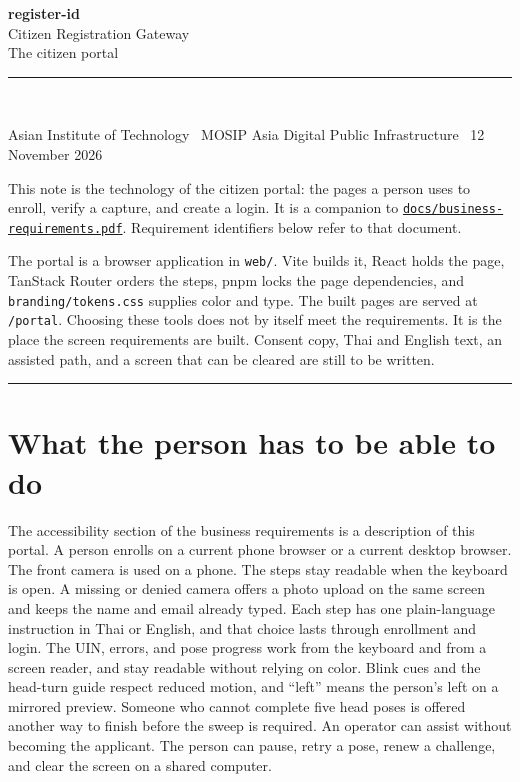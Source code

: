 \documentclass[11pt]{article}
\begin{document}
\color{ink}

{\sffamily\bfseries\LARGE\color{green} register-id}\\[0.25em]
{\sffamily\Large Citizen Registration Gateway}\\[0.15em]
{\sffamily\large The citizen portal}\\[0.7em]
{\color{rule}\rule{\textwidth}{1.1pt}}\\[0.55em]
{\small\color{muted}
Asian Institute of Technology \textperiodcentered\
MOSIP Asia Digital Public Infrastructure \textperiodcentered\
12 November 2026\par
}
\vspace{0.4em}

\noindent
This note is the technology of the citizen portal: the pages a person uses to enroll, verify a capture, and create a login. It is a companion to \href{business-requirements.pdf}{\texttt{docs/business-requirements.pdf}}. Requirement identifiers below refer to that document.

\vspace{0.35em}
\noindent
The portal is a browser application in \texttt{web/}. Vite builds it, React holds the page, TanStack Router orders the steps, pnpm locks the page dependencies, and \texttt{branding/tokens.css} supplies color and type. The built pages are served at \texttt{/portal}. Choosing these tools does not by itself meet the requirements. It is the place the screen requirements are built. Consent copy, Thai and English text, an assisted path, and a screen that can be cleared are still to be written.

\tableofcontents
\vspace{0.6em}
{\color{rule}\rule{\textwidth}{0.4pt}}

\section{What the person has to be able to do}

The accessibility section of the business requirements is a description of this portal. A person enrolls on a current phone browser or a current desktop browser. The front camera is used on a phone. The steps stay readable when the keyboard is open. A missing or denied camera offers a photo upload on the same screen and keeps the name and email already typed. Each step has one plain-language instruction in Thai or English, and that choice lasts through enrollment and login. The UIN, errors, and pose progress work from the keyboard and from a screen reader, and stay readable without relying on color. Blink cues and the head-turn guide respect reduced motion, and ``left'' means the person's left on a mirrored preview. Someone who cannot complete five head poses is offered another way to finish before the sweep is required. An operator can assist without becoming the applicant. The person can pause, retry a pose, renew a challenge, and clear the screen on a shared computer.
\end{document}
